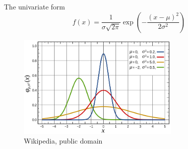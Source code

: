 \begin{frame}
\begin{block}{The univariate form}
\[f(x) = \frac{1}{\sigma\sqrt{2\pi}} \exp \left(-\frac{(x-\mu)^2}{2\sigma^2}\right)\]
\end{block}

\begin{figure}
    \includegraphics[width=0.7\textwidth]{images/plots/normal_distribution_wikipedia.png}
    \caption{Wikipedia, public domain}
\end{figure}
\end{frame}


